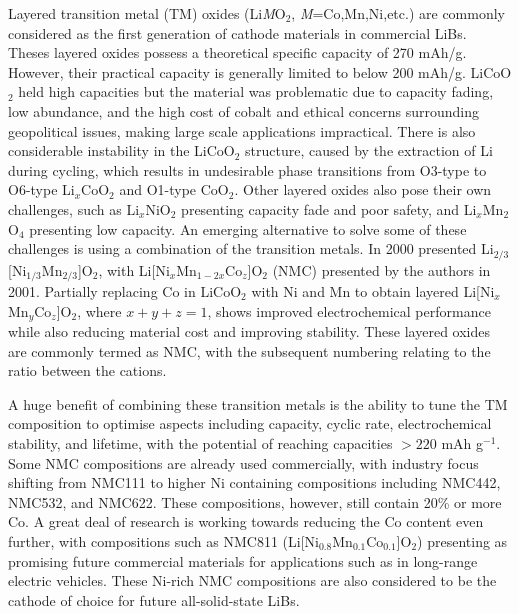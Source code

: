 \documentclass[../main.tex]{subfiles}
\begin{document}
Layered transition metal (TM) oxides (Li\textit{M}O$_2$, \textit{M}=Co,Mn,Ni,etc.) are commonly considered as the first generation of cathode materials in commercial LiBs. Theses layered oxides possess a theoretical specific capacity of 270 mAh/g. However, their practical capacity is generally limited to below 200 mAh/g. \cite{myung2017nickel} LiCoO$_2$ held high capacities but the material was problematic due to capacity fading, low abundance, and the high cost of cobalt and ethical concerns surrounding geopolitical issues, making large scale applications impractical. \cite{mo2018impact} There is also considerable instability in the LiCoO$_2$ structure, caused by the extraction of Li during cycling, which results in undesirable phase transitions from O3-type to O6-type Li$_x$CoO$_2$ and O1-type CoO$_2$. \cite{goonetilleke2018structural,chen2002staging} Other layered oxides also pose their own challenges, such as Li$_x$NiO$_2$ presenting capacity fade and poor safety, \cite{min2016comparative} and Li$_x$Mn$_2$O$_4$ presenting low capacity. \cite{tian2018performance} An emerging alternative to solve some of these challenges is using a combination of the transition metals. In 2000 \citeauthor{paulsen2000o2} presented Li$_{2/3}$[Ni$_{1/3}$Mn$_{2/3}$]O$_2$, \cite{paulsen2000o2,paulsen20002} with Li[Ni$_x$Mn$_{1-2x}$Co$_z$]O$_2$ (NMC) presented by the authors in 2001. \cite{lu2001layered} Partially replacing Co in LiCoO$_2$ with Ni and Mn to obtain layered Li[Ni$_x$Mn$_y$Co$_z$]O$_2$, \cite{rozier2015li} where $x+y+z=1$, shows improved electrochemical performance while also reducing material cost and improving stability.\cite{ohzuku2001layered} These layered oxides are commonly termed as NMC, with the subsequent numbering relating to the ratio between the cations.

A huge benefit of combining these transition metals is the ability to tune the TM composition to optimise aspects including capacity, cyclic rate, electrochemical stability, and lifetime, with the potential of reaching capacities $>220$ mAh g$^{-1}$. \cite{duan2019insights} Some NMC compositions are already used commercially, with industry focus shifting from NMC111 to higher Ni containing compositions including NMC442, NMC532, and NMC622. \cite{zhang2018structural} These compositions, however, still contain 20\% or more Co. A great deal of research is working towards reducing the Co content even further, with compositions such as NMC811 (Li[Ni$_{0.8}$Mn$_{0.1}$Co$_{0.1}$]O$_2$) presenting as promising future commercial materials for applications such as in long-range electric vehicles. \cite{azevedo2018mining} These Ni-rich NMC compositions are also considered to be the cathode of choice for future all-solid-state LiBs. \cite{myung2017nickel}
\end{document}
